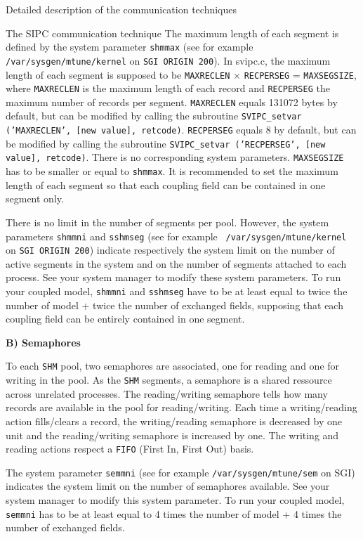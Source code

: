\begin{section}{Detailed description of the communication techniques}
\begin{subsection}{The SIPC communication technique}
The maximum length of each segment is defined by the system parameter 
{\tt shmmax} (see for example {\tt /var/sysgen/mtune/kernel} on 
{\tt SGI ORIGIN 200}). In svipc.c, the maximum length of each segment
is supposed to be {\tt MAXRECLEN} $\times$ {\tt RECPERSEG} = {\tt MAXSEGSIZE},
where {\tt MAXRECLEN} is the maximum length of each record and {\tt RECPERSEG}
the maximum number of records per segment. {\tt MAXRECLEN} equals
131072 bytes by default, but can be modified by 
calling the subroutine {\tt SVIPC\_setvar ('MAXRECLEN', [new value], retcode)}. 
{\tt RECPERSEG} equals 8 by default, but can be modified by calling the
subroutine {\tt SVIPC\_setvar ('RECPERSEG', [new value], retcode)}. There is no
corresponding system parameters. {\tt MAXSEGSIZE} has to be smaller or
equal to {\tt shmmax}. It is recommended to set the maximum length of
each segment so that each coupling field can be contained in one
segment only. 

There is no limit in the number of segments per pool. However, the system
parameters {\tt shmmni} and {\tt sshmseg} (see for example {\tt
/var/sysgen/mtune/kernel} on  {\tt  SGI ORIGIN 200}) indicate 
respectively the system limit on the number of active segments in the system 
and on the number of segments attached to each process. See your system 
manager to modify these system
parameters. To run your coupled model, {\tt shmmni} and {\tt sshmseg}
have to be at least 
equal to twice the number of model + twice the number of exchanged
fields,
supposing that each coupling field can be entirely contained in one
segment.

\vspace{.6truecm}

{\bf B) Semaphores}

\vspace{.3truecm}

To each {\tt SHM} pool, two semaphores are associated, one for reading
and one for writing in the pool. As the {\tt SHM} segments, a semaphore is a shared 
ressource across unrelated processes. The reading/writing semaphore tells how 
many records are available in the pool for reading/writing. Each 
time a writing/reading action fills/clears a
record, the writing/reading semaphore is decreased by one unit and the 
reading/writing semaphore is increased by one. The writing and reading actions
respect a {\tt FIFO} (First In, First Out) basis.

The system parameter {\tt semmni} (see for example {\tt /var/sysgen/mtune/sem} on SGI) indicates the system 
limit on the number of semaphores available. See your system manager to modify
this
system parameter. To run your coupled model, {\tt semmni} has to be at least 
equal to 4 times the number of model + 4 times the number of exchanged fields.


\end{subsection}
\end{section}
